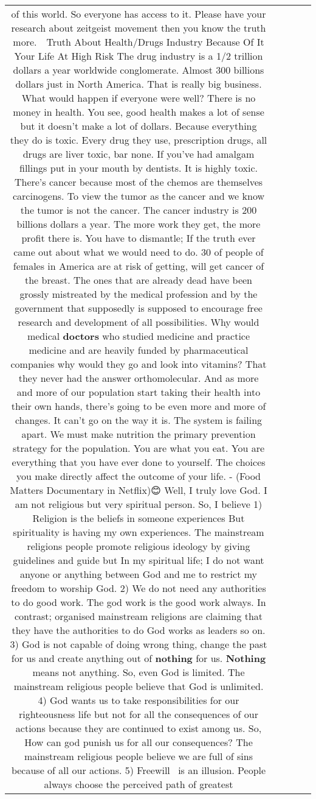 \documentclass[11pt]{article}
\newlength\mylength
\begin{document}
\begin{center}
\begin{longtable}{|C{.65\mylength}|C{.30\mylength}|C{.12\mylength}|C{.12\mylength}|C{.12\mylength}|}
of this world. So everyone has access to it. Please have your research about zeitgeist movement then you know the truth more.  Truth About Health/Drugs Industry Because Of It Your Life At High Risk The drug industry is a 1/2 trillion dollars a year worldwide conglomerate. Almost 300 billions dollars just in North America. That is really big business. What would happen if everyone were well? There is no money in health. You see, good health makes a lot of sense but it doesn't make a lot of dollars. Because everything they do is toxic. Every drug they use, prescription drugs, all drugs are liver toxic, bar none. If you've had amalgam fillings put in your mouth by dentists. It is highly toxic. There's cancer because most of the chemos are themselves carcinogens. To view the tumor as the cancer and we know the tumor is not the cancer. The cancer industry is 200 billions dollars a year. The more work they get, the more profit there is. You have to dismantle; If the truth ever came out about what we would need to do. 30 of people of females in America are at risk of getting, will get cancer of the breast. The ones that are already dead have been grossly mistreated by the medical profession and by the government that supposedly is supposed to encourage free research and development of all possibilities. Why would medical \textbf{doctors} who studied medicine and practice medicine and are heavily funded by pharmaceutical companies why would they go and look into vitamins? That they never had the answer orthomolecular. And as more and more of our population start taking their health into their own hands, there's going to be even more and more of changes. It can't go on the way it is. The system is failing apart. We must make nutrition the primary prevention strategy for the population. You are what you eat. You are everything that you have ever done to yourself. The choices you make directly affect the outcome of your life. - (Food Matters Documentary in Netflix)😊 Well, I truly love God. I am not religious but very spiritual person. So, I believe 1) Religion is the beliefs in someone experiences But spirituality is having my own experiences. The mainstream religions people promote religious ideology by giving guidelines and guide but In my spiritual life; I do not want anyone or anything between God and me to restrict my freedom to worship God. 2) We do not need any authorities to do good work. The god work is the good work always. In contrast; organised mainstream religions are claiming that they have the authorities to do God works as leaders so on. 3) God is not capable of doing wrong thing, change the past for us and create anything out of \textbf{nothing} for us. \textbf{Nothing} means not anything. So, even God is limited. The mainstream religious people believe that God is unlimited. 4) God wants us to take responsibilities for our righteousness life but not for all the consequences of our actions because they are continued to exist among us. So, How can god punish us for all our consequences? The mainstream religious people believe we are full of sins because of all our actions. 5) Freewill  is an illusion. People always choose the perceived path of greatest 
\end{longtable}
\end{center}
\end{document}
